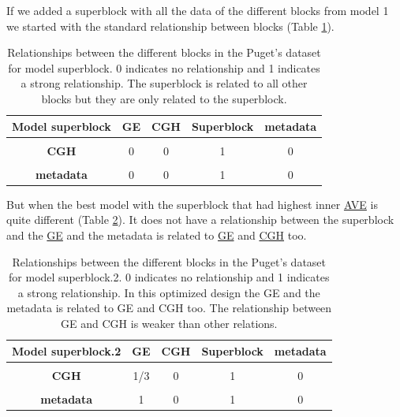 \documentclass[
  12pt,
  a4paper,
  twoside,
  openright]{book}
\begin{document}
If we added a superblock with all the data of the different blocks from model 1 we started with the standard relationship between blocks (Table \ref{tab:puget-model-superblock}).

\begin{table}[H]

\caption[Model with superblock for Puget's dataset.]{\label{tab:puget-model-superblock}Relationships between the different blocks in the Puget's dataset for model superblock. 0 indicates no relationship and 1 indicates a strong relationship. The superblock is related to all other blocks but they are only related to the superblock.}
\centering
\begin{tabular}[t]{>{}c|c|c|c|c}
\hline
\textbf{Model superblock} & \textbf{GE} & \textbf{CGH} & \textbf{Superblock} & \textbf{metadata}\\
\hline
\textbf{\cellcolor{gray!6}{GE}} & \cellcolor{gray!6}{0} & \cellcolor{gray!6}{0} & \cellcolor{gray!6}{1} & \cellcolor{gray!6}{0}\\
\hline
\textbf{CGH} & 0 & 0 & 1 & 0\\
\hline
\textbf{\cellcolor{gray!6}{Superblock}} & \cellcolor{gray!6}{1} & \cellcolor{gray!6}{1} & \cellcolor{gray!6}{0} & \cellcolor{gray!6}{1}\\
\hline
\textbf{metadata} & 0 & 0 & 1 & 0\\
\hline
\end{tabular}
\end{table}

But when the best model with the superblock that had highest inner \protect\hyperlink{acronyms_AVE}{AVE} is quite different (Table \ref{tab:puget-model-superblock-2}).
It does not have a relationship between the superblock and the \protect\hyperlink{acronyms_GE}{GE} and the metadata is related to \protect\hyperlink{acronyms_GE}{GE} and \protect\hyperlink{acronyms_CGH}{CGH} too.

\begin{table}[H]

\caption[Model with superblock.2 for the Puget's dataset.]{\label{tab:puget-model-superblock-2}Relationships between the different blocks in the Puget's dataset for model superblock.2. 0 indicates no relationship and 1 indicates a strong relationship. In this optimized design the GE and the metadata is related to GE and CGH too. The relationship between GE and CGH is weaker than other relations.}
\centering
\begin{tabular}[t]{>{}c|c|c|c|c}
\hline
\textbf{Model superblock.2} & \textbf{GE} & \textbf{CGH} & \textbf{Superblock} & \textbf{metadata}\\
\hline
\textbf{\cellcolor{gray!6}{GE}} & \cellcolor{gray!6}{1} & \cellcolor{gray!6}{1/3} & \cellcolor{gray!6}{0} & \cellcolor{gray!6}{1}\\
\hline
\textbf{CGH} & 1/3 & 0 & 1 & 0\\
\hline
\textbf{\cellcolor{gray!6}{Superblock}} & \cellcolor{gray!6}{0} & \cellcolor{gray!6}{1} & \cellcolor{gray!6}{0} & \cellcolor{gray!6}{0}\\
\hline
\textbf{metadata} & 1 & 0 & 1 & 0\\
\hline
\end{tabular}
\end{table}
\end{document}
